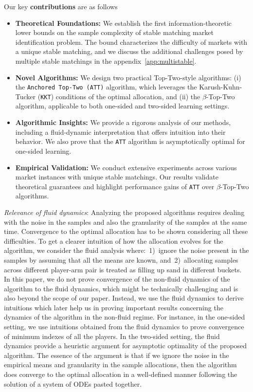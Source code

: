 \documentclass{article}
\begin{document}
Our key {\bf contributions} are as follows
\begin{itemize}[leftmargin=*, nosep,noitemsep, topsep=0pt]
\item \textbf{Theoretical Foundations:} We establish the first information-theoretic lower bounds on the sample complexity of stable matching market identification problem. The bound characterizes the difficulty of markets with a unique stable matching, and we discuss the additional challenges posed by multiple stable matchings in the appendix~\ref{app:multistable}.

\item \textbf{Novel Algorithms:} We design two practical Top-Two-style algorithms: (i) the \texttt{Anchored Top-Two (ATT)} algorithm, which leverages the Karush-Kuhn-Tucker (\texttt{KKT}) conditions of the optimal allocation, and (ii) the $\beta$-Top-Two algorithm, applicable to both one-sided and two-sided learning settings.

\item \textbf{Algorithmic Insights:} We provide a rigorous analysis of our methods, including a fluid-dynamic interpretation that offers intuition into their behavior. We also prove that the \texttt{ATT} algorithm is asymptotically optimal for one-sided learning.

\item \textbf{Empirical Validation:} We conduct extensive experiments across various market instances with unique stable matchings. Our results validate theoretical guarantees and highlight performance gains of \texttt{ATT} over $\beta$-Top-Two algorithms.
\end{itemize}

\textit{Relevance of fluid dynamics}: Analyzing the proposed algorithms requires dealing with the noise in the samples and also the granularity of the samples at the same time. Convergence to the optimal allocation has to be shown considering all these difficulties. To get a clearer intuition of how the allocation evolves for the algorithm, we consider the fluid analysis where:~1)~ignore the noise present in the samples by assuming that all the means are known, and~2)~allocating samples across different player-arm pair is treated as filling up sand in different buckets. In this paper, we do not prove convergence of the non-fluid dynamics of the algorithm to the fluid dynamics, which might be technically challenging and is also beyond the scope of our paper. Instead, we use the fluid dynamics to derive intuitions which later help us in proving important results concerning the dynamics of the algorithm in the non-fluid regime. For instance, in the one-sided setting, we use intuitions obtained from the fluid dynamics to prove convergence of minimum indexes of all the players. In the two-sided setting, the fluid dynamics provide a heuristic argument for asymptotic optimality of the proposed algorithm. The essence of the argument is that if we ignore the noise in the empirical means and granularity in the sample allocations, then the algorithm does converge to the optimal allocation in a well-defined manner following the solution of a system of ODEs pasted together.
\end{document}
